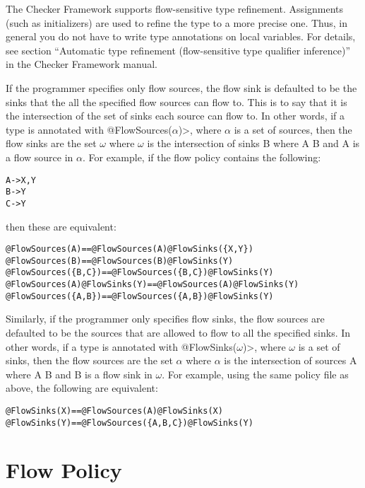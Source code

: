 The Checker Framework supports flow-sensitive type refinement.  Assignments (such as
initializers) are used to refine the type to a more precise one.  Thus, in
general you do not have to write type annotations on local variables.  For
details, see section ``Automatic type refinement (flow-sensitive type
qualifier inference)'' in the Checker Framework manual.

If the programmer specifies only flow sources, the flow sink is defaulted
to be the
sinks that the all the specified flow sources can flow to. This is to say that 
it is the intersection of the set of sinks each source can flow to.
 In other words, if a type is annotated with 
\<@FlowSources($\alpha$)>, where $\alpha$ is a set of sources, then the flow sinks are the set 
$\omega$ where $\omega$ is the intersection of sinks B where A \flowsto{} B and A is a flow source in 
$\alpha$.  For example, if the flow policy contains the following:

\begin{alltt}
  A -> X,Y
  B -> Y
  C -> Y
\end{alltt}
  
\noindent 
then these are equivalent:

\begin{alltt}
  @FlowSources(A)                 ==   @FlowSources(A) @FlowSinks(\{X, Y\})
  @FlowSources(B)                 ==   @FlowSources(B) @FlowSinks(Y)
  @FlowSources(\{B,C\})             ==   @FlowSources(\{B,C\}) @FlowSinks(Y)
  @FlowSources(A) @FlowSinks(Y)   ==   @FlowSources(A) @FlowSinks(Y) 
  @FlowSources(\{A,B\})             ==   @FlowSources(\{A,B\}) @FlowSinks(Y)
\end{alltt}


Similarly, if the programmer only specifies flow sinks, the flow sources are defaulted to be the sources 
that are allowed to flow to all the specified sinks.  In other words, if a type is annotated with 
\<@FlowSinks($\omega$)>, where $\omega$ is a set of sinks, then the flow sources are the set 
$\alpha$ where $\alpha$ is the intersection of sources A where A \flowsto{} B and B is a flow sink in 
$\omega$. For example, using the same policy file as above, the following are equivalent:

\begin{alltt}
  @FlowSinks(X)                   ==   @FlowSources(A) @FlowSinks(X)
  @FlowSinks(Y)                   ==   @FlowSources(\{A,B,C\}) @FlowSinks(Y)
\end{alltt}

\section{Flow Policy\label{sec:flowpolicy}}


